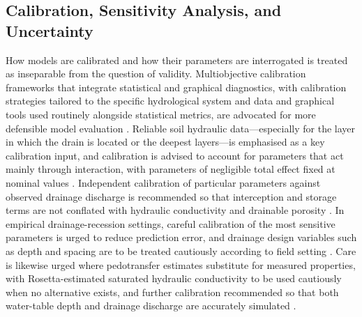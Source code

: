 \documentclass[11pt]{article}
\begin{document}
\subsection{Calibration, Sensitivity Analysis, and Uncertainty}

How models are calibrated and how their parameters are interrogated is treated as inseparable from the question of validity. Multiobjective calibration frameworks that integrate statistical and graphical diagnostics, with calibration strategies tailored to the specific hydrological system and data and graphical tools used routinely alongside statistical metrics, are advocated for more defensible model evaluation \parencite{Bruhn2025}. Reliable soil hydraulic data---especially for the layer in which the drain is located or the deepest layers---is emphasised as a key calibration input, and calibration is advised to account for parameters that act mainly through interaction, with parameters of negligible total effect fixed at nominal values \parencite{Wang2006}. Independent calibration of particular parameters against observed drainage discharge is recommended so that interception and storage terms are not conflated with hydraulic conductivity and drainable porosity \parencite{Henine2022}. In empirical drainage-recession settings, careful calibration of the most sensitive parameters is urged to reduce prediction error, and drainage design variables such as depth and spacing are to be treated cautiously according to field setting \parencite{Timalsina2023}. Care is likewise urged where pedotransfer estimates substitute for measured properties, with Rosetta-estimated saturated hydraulic conductivity to be used cautiously when no alternative exists, and further calibration recommended so that both water-table depth and drainage discharge are accurately simulated \parencite{Malota2022}.
\end{document}
